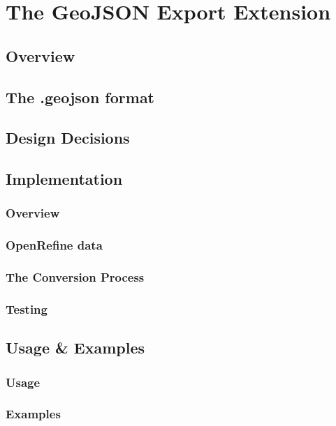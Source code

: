 \chapter{The GeoJSON Export Extension}\label{ch:the-geojson-export-extension}
\section{Overview}
\lipsum[3-6]

\section{The .geojson format}
\lipsum[13-16]

\section{Design Decisions}
\lipsum[7-8]

\section{Implementation}
\subsection{Overview}
\lipsum[9-11]
\subsection{OpenRefine data}
\lipsum[12-14]
\subsection{The Conversion Process}
\lipsum[15-17]
\subsection{Testing}
\lipsum[18-20]

\section{Usage \& Examples}
\lipsum[9-10]
\subsection{Usage}
\lipsum[18-20]
\subsection{Examples}
\lipsum[3-4]